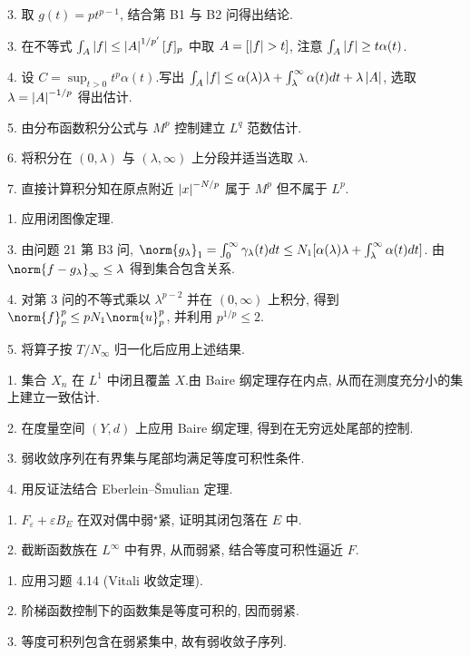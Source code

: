 3. 取 $g(t)=pt^{p-1}$, 结合第 B1 与 B2 问得出结论.


3. 在不等式 $\int_A\left|f\right|\le\left|A\right|^{1/p'}[f]_p$ 中取 $A=[\abs{f}>t]$, 注意 $\int_A\left|f\right|\ge t\alpha(t)$.

4. 设 $C=\sup_{t>0}t^p\alpha(t)$.写出 $\int_A\left|f\right|\le\alpha(\lambda)\lambda+\int_\lambda^\infty\alpha(t)dt+\lambda\left|A\right|$,
选取 $\lambda=\left|A\right|^{-1/p}$ 得出估计.

5. 由分布函数积分公式与 $M^p$ 控制建立 $L^q$ 范数估计.

6. 将积分在 $(0,\lambda)$ 与 $(\lambda,\infty)$ 上分段并适当选取 $\lambda$.

7. 直接计算积分知在原点附近 $\left|x\right|^{-N/p}$ 属于 $M^p$ 但不属于 $L^p$.


1. 应用闭图像定理.

3. 由问题 21 第 B3 问, $\norm{g_\lambda}_1=\int_0^\infty\gamma_\lambda(t)dt\le N_1[\alpha(\lambda)\lambda+\int_\lambda^\infty\alpha(t)dt]$.
由 $\norm{f-g_\lambda}_\infty\le\lambda$ 得到集合包含关系.

4. 对第 3 问的不等式乘以 $\lambda^{p-2}$ 并在 $(0,\infty)$ 上积分, 得到
$\norm{f}_p^p\le pN_1\norm{u}_p^p$, 并利用 $p^{1/p}\le2$.

5. 将算子按 $T/N_\infty$ 归一化后应用上述结果.



1. 集合 $X_n$ 在 $L^1$ 中闭且覆盖 $X$.由 Baire 纲定理存在内点, 从而在测度充分小的集上建立一致估计.

2. 在度量空间 $(Y,d)$ 上应用 Baire 纲定理, 得到在无穷远处尾部的控制.

3. 弱收敛序列在有界集与尾部均满足等度可积性条件.

4. 用反证法结合 Eberlein--Šmulian 定理.


1. $F_\varepsilon+\varepsilon B_E$ 在双对偶中弱$^\star$紧, 证明其闭包落在 $E$ 中.

2. 截断函数族在 $L^\infty$ 中有界, 从而弱紧, 结合等度可积性逼近 $F$.


1. 应用习题 4.14 (Vitali 收敛定理).

2. 阶梯函数控制下的函数集是等度可积的, 因而弱紧.

3. 等度可积列包含在弱紧集中, 故有弱收敛子序列.

